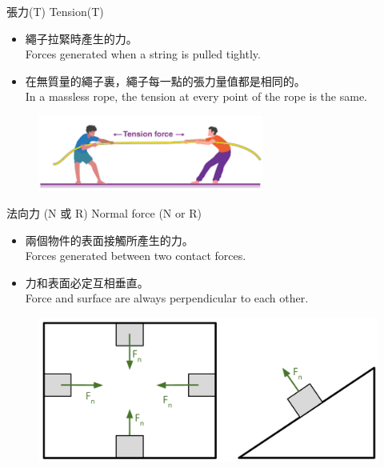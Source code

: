 \documentclass[beamer=true]{standalone}
\begin{document}
\begin{frame}{張力(T) Tension(T)}
    \begin{itemize}
        \item 繩子拉緊時產生的力。\\Forces generated when a string is pulled tightly.
        \item 在無質量的繩子裏，繩子每一點的張力量值都是相同的。\\In a massless rope, the tension at every point of the rope is the same.
    \end{itemize}
    \begin{figure}[h!]
        \centering
        \includegraphics[width=0.66\textwidth]{assets/5673f702.png}
    \end{figure}
\end{frame}

\begin{frame}{法向力 (N 或 R) Normal force (N or R)}
    \begin{itemize}
        \item 兩個物件的表面接觸所產生的力。\\Forces generated between two contact forces.
        \item 力和表面必定互相垂直。\\Force and surface are always perpendicular to each other.
    \end{itemize}
    \begin{figure}[h!]
        \centering
        \includegraphics[width=.8\textwidth]{assets/77585bbc.png}
    \end{figure}
\end{frame}
\end{document}
